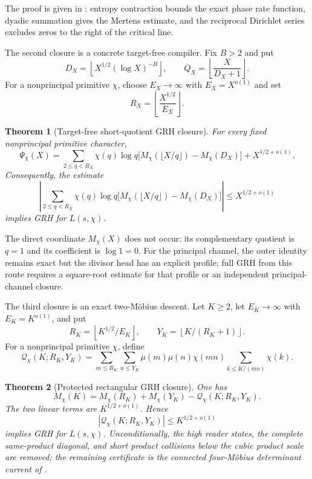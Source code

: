 \documentclass[11pt]{article}
\newtheorem{theorem}{Theorem}[section]
\theoremstyle{definition}
\theoremstyle{remark}
\begin{document}
The proof is given in : entropy
contraction bounds the exact phase rate function, dyadic summation gives the
Mertens estimate, and the reciprocal Dirichlet series excludes zeros to the
right of the critical line.

The second closure is a concrete target-free compiler.  Fix $B>2$ and put
\[
 D_X=\left\lfloor X^{1/2}(\log X)^{-B}\right\rfloor,
 \qquad
 Q_X=\left\lfloor\frac{X}{D_X+1}\right\rfloor.
\]
For a nonprincipal primitive $\chi$, choose $E_X\to\infty$ with
$E_X=X^{o(1)}$ and set
\[
 R_X=\left\lfloor\frac{X^{1/2}}{E_X}\right\rfloor.
\]

\begin{theorem}[Target-free short-quotient GRH closure]
\label{thm:intro-short-GRH}
For every fixed nonprincipal primitive character,
\[
 \Psi_\chi(X)
 =\sum_{2\le q<R_X}\chi(q)\log q
   \bigl[M_\chi(\lfloor X/q\rfloor)-M_\chi(D_X)\bigr]
  +X^{1/2+o(1)}.
\]
Consequently, the estimate
\[
 \left|
 \sum_{2\le q<R_X}\chi(q)\log q
   \bigl[M_\chi(\lfloor X/q\rfloor)-M_\chi(D_X)\bigr]
 \right|
 \le X^{1/2+o(1)}
\]
implies GRH for $L(s,\chi)$.
\end{theorem}

The direct coordinate $M_\chi(X)$ does not occur: its complementary quotient
is $q=1$ and its coefficient is $\log1=0$.  For the principal channel, the
outer identity remains exact but the divisor head has an explicit profile;
full GRH from this route requires a square-root estimate for that profile or
an independent principal-channel closure.

The third closure is an exact two-M\"obius descent.  Let $K\ge2$, let
$E_K\to\infty$ with $E_K=K^{o(1)}$, and put
\[
 R_K=\left\lfloor K^{1/2}/E_K\right\rfloor,
 \qquad
 Y_K=\left\lfloor K/(R_K+1)\right\rfloor.
\]
For a nonprincipal primitive $\chi$, define
\[
 \mathcal Q_\chi(K;R_K,Y_K)
 =\sum_{m\le R_K}\sum_{n\le Y_K}
  \mu(m)\mu(n)\chi(mn)
  \sum_{k\le K/(mn)}\chi(k).
\]

\begin{theorem}[Protected rectangular GRH closure]
\label{thm:intro-rectangular-GRH}
One has
\[
 M_\chi(K)=M_\chi(R_K)+M_\chi(Y_K)
 -\mathcal Q_\chi(K;R_K,Y_K).
\]
The two linear terms are $K^{1/2+o(1)}$.  Hence
\[
 |\mathcal Q_\chi(K;R_K,Y_K)|\le K^{1/2+o(1)}
\]
implies GRH for $L(s,\chi)$.  Unconditionally, the high reader states, the
complete same-product diagonal, and short product collisions below the cubic
product scale are removed; the remaining certificate is the connected
four-M\"obius determinant current of .
\end{theorem}
\end{document}
